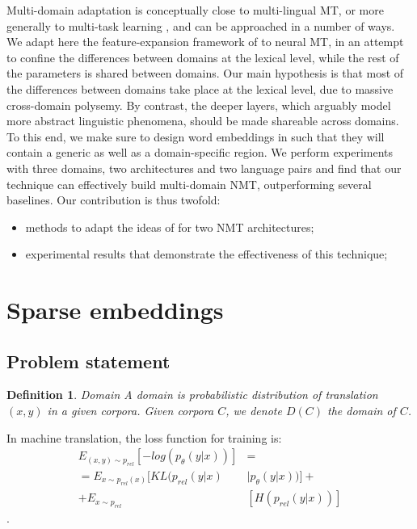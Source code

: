 \documentclass[11pt,a4paper]{article}
\newtheorem{definition}{Definition}[section]
\newcommand{\fyTodo}[1]{\Todo[FY:]{\textcolor{orange}{#1}}}
\newcommand{\fyDone}[1]{\done[FY]\Todo[FY:]{\textcolor{orange}{#1}}}
\begin{document}
Multi-domain adaptation is conceptually close to multi-lingual MT, or more generally to multi-task learning \cite{Caruana97multitask}, and can be approached in a number of ways. We adapt here the feature-expansion framework of \cite{Daume07frustratingly} to neural MT, in an attempt to confine the differences between domains at the lexical level, while the rest of the parameters is shared between domains. Our main hypothesis is that most of the differences between domains take place at the lexical level, due to massive cross-domain polysemy. By contrast, the deeper layers, which arguably model more abstract linguistic phenomena, should be made shareable across domains.
To this end, we make sure to design word embeddings in such that they will contain a generic as well as a domain-specific region. We perform experiments with three domains, two architectures and two language pairs and find that our technique can effectively build multi-domain NMT, outperforming several baselines. Our contribution is thus twofold:
\begin{itemize}
\item methods to adapt the ideas of \cite{Daume07frustratingly} for two NMT architectures;
\item experimental results that demonstrate the effectiveness of this technique;
\end{itemize}
\fyTodo{can we train in random order ? can we get away with catastrophic forgetting ?}
\fyTodo{how to analyze the embeddings ? how can we test or claim ?}

\section{Sparse embeddings \label{sec:sparse_embeddings}}
\fyDone{Use meaningful titles throughout}

\subsection{Problem statement}
\fyTodo{Use math for notation, label equations and such}
\begin{definition}{Domain}
\label{def:domain}
A domain is probabilistic distribution of translation $(x,y)$ in a given corpora. Given corpora $C$, we denote $D(C)$ the domain of $C$.
\end{definition}
\fyTodo{We need more: the source, the target, etc}
In machine translation, the loss function for training is:
\begin{equation}\label{eq:1}
\begin{split}
E_{(x,y) \sim p_{rel}}[-log(p_{\theta}(y|x))] &= \\
= E_{x \sim p_{rel}(x)}[KL(p_{rel}(y|x) & \mid p_{\theta}(y|x))] + \\
+ E_{x \sim p_{rel}} &[H(p_{rel}(y|x))]
\end{split}
\end{equation}.
\end{document}
